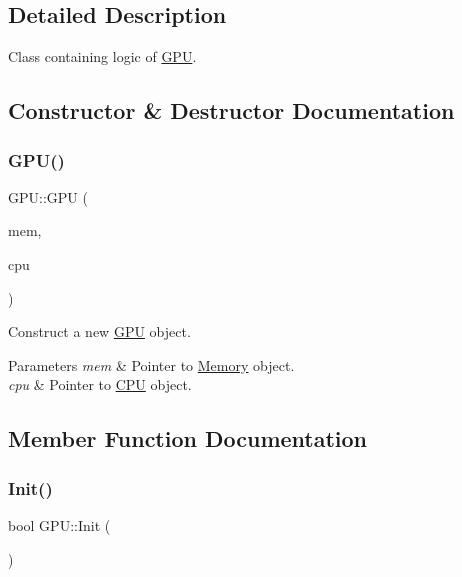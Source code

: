 \subsection{Detailed Description}
Class containing logic of \mbox{\hyperlink{classGPU}{G\+PU}}. 

\subsection{Constructor \& Destructor Documentation}
\mbox{\label{classGPU_a18e803c48776e14aa5b04d58a35ec4ac}} 
\subsubsection{\texorpdfstring{G\+P\+U()}{GPU()}}
{\footnotesize\ttfamily G\+P\+U\+::\+G\+PU (\begin{DoxyParamCaption}\item[{\mbox{\hyperlink{classMemory}{Memory}} $\ast$}]{mem,  }\item[{\mbox{\hyperlink{classCPU}{C\+PU}} $\ast$}]{cpu }\end{DoxyParamCaption})}



Construct a new \mbox{\hyperlink{classGPU}{G\+PU}} object. 


\begin{DoxyParams}{Parameters}
{\em mem} & Pointer to \mbox{\hyperlink{classMemory}{Memory}} object. \\
\hline
{\em cpu} & Pointer to \mbox{\hyperlink{classCPU}{C\+PU}} object. \\
\hline
\end{DoxyParams}


\subsection{Member Function Documentation}
\mbox{\label{classGPU_a712acb0ed0ea3baf05379b26922d43f7}} 
\subsubsection{\texorpdfstring{Init()}{Init()}}
{\footnotesize\ttfamily bool G\+P\+U\+::\+Init (\begin{DoxyParamCaption}{ }\end{DoxyParamCaption})}




